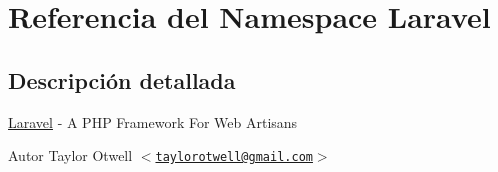 \hypertarget{namespace_laravel}{\section{\-Referencia del \-Namespace \-Laravel}
\label{namespace_laravel}
}


\subsection{\-Descripción detallada}
\hyperlink{namespace_laravel}{\-Laravel} -\/ \-A \-P\-H\-P \-Framework \-For \-Web \-Artisans

\begin{DoxyAuthor}{\-Autor}
\-Taylor \-Otwell $<$\href{mailto:taylorotwell@gmail.com}{\tt taylorotwell@gmail.\-com}$>$ 
\end{DoxyAuthor}

